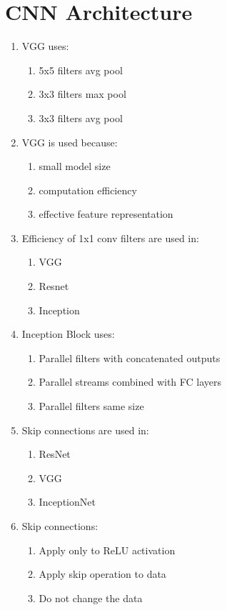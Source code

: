 \documentclass{report}
\numberwithin{equation}{section}
\begin{document}
\section{CNN Architecture}
\begin{enumerate}
\item VGG uses:
\begin{enumerate}[label=\alph*.]
    \item 5x5 filters avg pool
    \item 3x3 filters max pool
    \item 3x3 filters avg pool
\end{enumerate}
\item VGG is used because:
\begin{enumerate}[label=\alph*.]
    \item small model size
    \item computation efficiency
    \item effective feature representation

\end{enumerate}
\item Efficiency of 1x1 conv filters are used in:
\begin{enumerate}[label=\alph*.]
    \item VGG
    \item Resnet
    \item Inception
\end{enumerate}
\item Inception Block uses:
\begin{enumerate}[label=\alph*.]
    \item Parallel filters with concatenated outputs
    \item Parallel streams combined with FC layers
    \item Parallel filters same size
\end{enumerate}
\item Skip connections are used in:
\begin{enumerate}[label=\alph*.]
    \item ResNet
    \item VGG
    \item InceptionNet
\end{enumerate}
\item Skip connections:
\begin{enumerate}[label=\alph*.]
    \item Apply only to ReLU activation
    \item Apply skip operation to data
    \item Do not change the data
\end{enumerate}
\end{enumerate}
\end{document}
